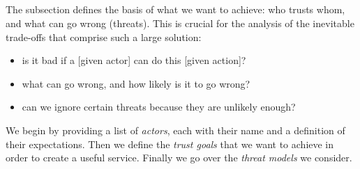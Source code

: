 \subsection{\rot}

The \rot subsection defines the basis of what we want to achieve: who trusts whom, and what can go wrong (threats).
This is crucial for the analysis of the inevitable trade-offs that comprise such a large solution:

\begin{itemize}
    \item is it bad if a [given actor] can do this [given action]?
    \item what can go wrong, and how likely is it to go wrong?
    \item can we ignore certain threats because they are unlikely enough?
\end{itemize}

We begin by providing a list of \emph{actors}, each with their name and a definition of their expectations.
Then we define the \emph{trust goals} that we want to achieve in order to create a useful service.
Finally we go over the \emph{threat models} we consider.
